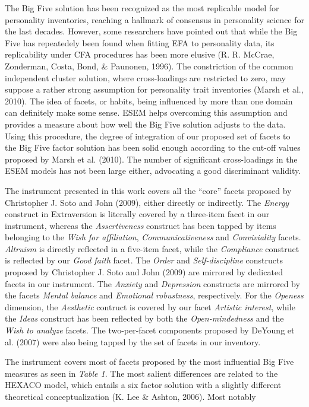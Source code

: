 \documentclass[,man,floatsintext]{apa6}
\begin{document}
The Big Five solution has been recognized as the most replicable model
for personality inventories, reaching a hallmark of consensus in
personality science for the last decades. However, some researchers have
pointed out that while the Big Five has repeatedely been found when
fitting EFA to personality data, its replicability under CFA procedures
has been more elusive (R. R. McCrae, Zonderman, Costa, Bond, \&
Paunonen, 1996). The constriction of the common independent cluster
solution, where cross-loadings are restricted to zero, may suppose a
rather strong assumption for personality trait inventories (Marsh et
al., 2010). The idea of facets, or habits, being influenced by more than
one domain can definitely make some sense. ESEM helps overcoming this
assumption and provides a measure about how well the Big Five solution
adjusts to the data. Using this procedure, the degree of integration of
our proposed set of facets to the Big Five factor solution has been
solid enough according to the cut-off values proposed by Marsh et al.
(2010). The number of significant cross-loadings in the ESEM models has
not been large either, advocating a good discriminant validity.

The instrument presented in this work covers all the \enquote{core}
facets proposed by Christopher J. Soto and John (2009), either directly
or indirectly. The \emph{Energy} construct in Extraversion is literally
covered by a three-item facet in our instrument, whereas the
\emph{Assertiveness} construct has been tapped by items belonging to the
\emph{Wish for affiliation}, \emph{Communicativeness} and
\emph{Conviviality} facets. \emph{Altruism} is directly reflected in a
five-item facet, while the \emph{Compliance} construct is reflected by
our \emph{Good faith} facet. The \emph{Order} and \emph{Self-discipline}
constructs proposed by Christopher J. Soto and John (2009) are mirrored
by dedicated facets in our instrument. The \emph{Anxiety} and
\emph{Depression} constructs are mirrored by the facets \emph{Mental
balance} and \emph{Emotional robustness}, respectively. For the
\emph{Openess} dimension, the \emph{Aesthetic} contruct is covered by
our facet \emph{Artistic interest}, while the \emph{Ideas} construct has
been reflected by both the \emph{Open-mindedness} and the \emph{Wish to
analyze} facets. The two-per-facet components proposed by DeYoung et al.
(2007) were also being tapped by the set of facets in our inventory.

The instrument covers most of facets proposed by the most influential
Big Five measures as seen in \emph{Table 1}. The most salient
differences are related to the HEXACO model, which entails a six factor
solution with a slightly different theoretical conceptualization (K. Lee
\& Ashton, 2006). Most notably
\end{document}
